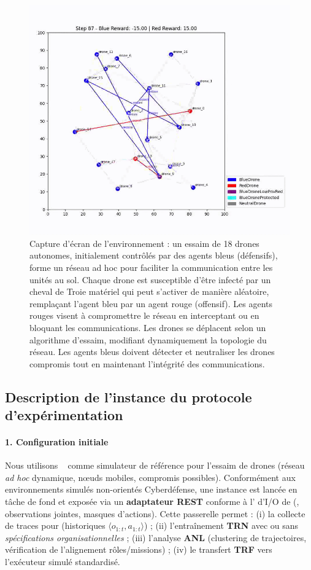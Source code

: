 \begin{figure}[h!]
  \centering
  \includegraphics[trim=0cm 1cm 0cm 1cm, clip, width=0.6\linewidth]{figures/cyborg.png}
  \caption[Capture d'écran de l'environnement ]{Capture d'écran de l'environnement  : un essaim de 18 drones autonomes, initialement contrôlés par des agents bleus (défensifs), forme un réseau ad hoc pour faciliter la communication entre les unités au sol. Chaque drone est susceptible d'être infecté par un cheval de Troie matériel qui peut s'activer de manière aléatoire, remplaçant l'agent bleu par un agent rouge (offensif). Les agents rouges visent à compromettre le réseau en interceptant ou en bloquant les communications. Les drones se déplacent selon un algorithme d'essaim, modifiant dynamiquement la topologie du réseau. Les agents bleus doivent détecter et neutraliser les drones compromis tout en maintenant l'intégrité des communications.}
  \label{fig:cyborg}
\end{figure}

\subsection{Description de l'instance du protocole d'expérimentation}

\paragraph{1. Configuration initiale}

Nous utilisons \textbf{}~\cite{Standen2021} comme simulateur de référence pour l'essaim de drones (réseau \textit{ad hoc} dynamique, nœuds mobiles, compromis possibles). Conformément aux environnements simulés non-orientés Cyberdéfense, une instance  est lancée en tâche de fond et exposée via un \textbf{adaptateur REST} conforme à l' d'I/O de  (, observations jointes, masques d'actions). Cette passerelle permet : (i) la collecte de traces pour  (historiques $\langle o_{1:t}, a_{1:t} \rangle$) ; (ii) l'entraînement  \textbf{TRN} avec ou sans \textit{spécifications organisationnelles} ; (iii) l'analyse \textbf{ANL} (clustering de trajectoires, vérification de l'alignement rôles/missions) ; (iv) le transfert \textbf{TRF} vers l'exécuteur simulé standardisé.

